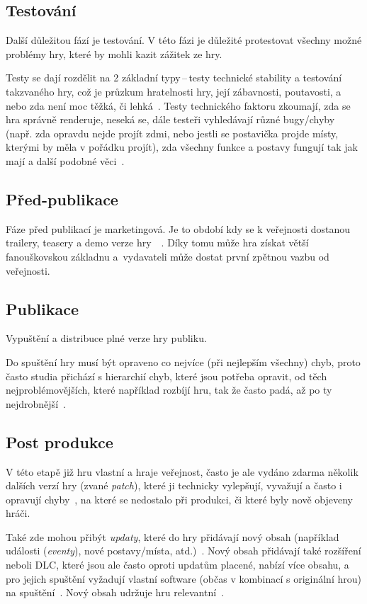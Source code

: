 \subsection*{Testování}
Další důležitou fází je testování. V této fázi je důležité protestovat všechny možné problémy hry, které by mohli kazit zážitek ze hry.

Testy se dají rozdělit na 2 základní typy\,--\,testy technické stability a testování takzvaného  hry, což je průzkum hratelnosti hry, její zábavnosti, poutavosti, a nebo zda není moc těžká, či lehká~\cite{GameMaker_development}. Testy technického faktoru zkoumají, zda se hra správně renderuje, neseká se, dále testeři vyhledávají různé bugy/chyby (např. zda opravdu nejde projít zdmi, nebo jestli se postavička projde místy, kterými by měla v pořádku projít), zda všechny funkce a postavy fungují tak jak mají a další podobné věci~\cite{g2_game_development}.

\subsection*{Před-publikace}
Fáze před publikací je marketingová. Je to období kdy se k veřejnosti dostanou trailery, teasery a demo verze hry~~\cite{GameMaker_development}. Díky tomu může hra získat větší fanouškovskou základnu a~vydavateli může dostat první zpětnou vazbu od veřejnosti.

\subsection*{Publikace}
Vypuštění a distribuce plné verze hry publiku.

Do spuštění hry musí být opraveno co nejvíce (při nejlepším všechny) chyb, proto často studia přichází s hierarchií chyb, které jsou potřeba opravit, od těch nejproblémovějších, které například rozbíjí hru, tak že často padá, až po ty nejdrobnější~\cite{g2_game_development}.

\subsection*{Post produkce}
V této etapě již hru vlastní a hraje veřejnost, často je ale vydáno zdarma několik dalších verzí hry (zvané \textit{patch}), které ji technicky vylepšují, vyvažují a často i opravují chyby~\cite{novak2011game}, na které se nedostalo při produkci, či které byly nově objeveny hráči. 

Také zde mohou přibýt \textit{updaty}, které do hry přidávají nový obsah (například události (\textit{eventy}), nové postavy/místa, atd.)~\cite{g2_game_development}. Nový obsah přidávají také rozšíření neboli DLC, které jsou ale často oproti updatům placené, nabízí více obsahu, a pro jejich spuštění vyžadují vlastní software (občas v kombinací s originální hrou) na spuštění~\cite{novak2011game}. Nový obsah udržuje hru relevantní~\cite{GameMaker_development}.

